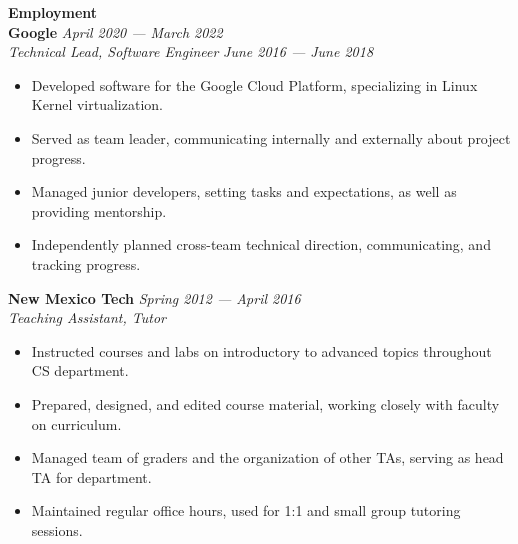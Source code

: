 \documentclass[11pt,a4paper,sans]{article}
\newcommand{\cvcolor}[1]{{\color{MidnightBlue}#1}}
\renewcommand{\section}[1]{
  \cvcolor{\noindent \textbf{\LARGE #1}}
  \vspace{.5em}\\
}
\begin{document}
\begin{multicols}{3}
\end{multicols}

\vspace{-1em}
\section{Employment}
\textbf{Google}                            \hfill \textsl{April 2020 --- March 2022}\\
\textsl{Technical Lead, Software Engineer} \hfill \textsl{June 2016 --- June 2018}
\vspace{.25em}
\begin{itemize}
  \item Developed software for the Google Cloud Platform, specializing in
    Linux Kernel virtualization.
  \item Served as team leader, communicating internally and externally about
    project progress.
  \item Managed junior developers, setting tasks and expectations, as well as
    providing mentorship.
  \item Independently planned cross-team technical direction,
    communicating, and tracking progress.
\end{itemize}
\vspace{1em}
\textbf{New Mexico Tech} \hfill \textsl{Spring 2012 --- April 2016}\\
\textsl{Teaching Assistant, Tutor}
\vspace{.25em}
\begin{itemize}
  \item Instructed courses and labs on introductory to advanced topics
    throughout CS department.
  \item Prepared, designed, and edited course material, working closely with
    faculty on curriculum.
  \item Managed team of graders and the organization of other TAs, serving as
    head TA for department.
  \item Maintained regular office hours, used for 1:1 and small group tutoring
    sessions.
\end{itemize}
\vspace{1em}
\end{document}
